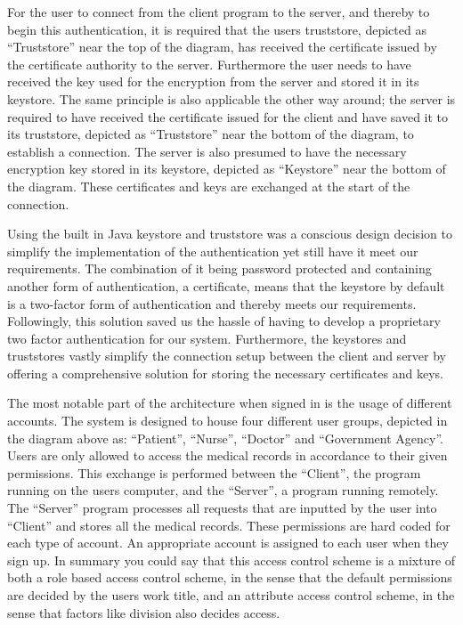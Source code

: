 \documentclass{article}
\begin{document}
For the user to connect from the client program to the server, and thereby to begin this authentication, it is required that the users truststore, depicted as “Truststore” near the top of the diagram, has received the certificate issued by the certificate authority to the server. Furthermore the user needs to have received the key used for the encryption from the server and stored it in its keystore. The same principle is also applicable the other way around; the server is required to have received the certificate issued for the client and have saved it to its truststore, depicted as “Truststore” near the bottom of the diagram, to establish a connection. The server is also presumed to have the necessary encryption key stored in its keystore, depicted as “Keystore” near the bottom of the diagram. These certificates and keys are exchanged at the start of the connection.

Using the built in Java keystore and truststore was a conscious design decision to simplify the implementation of the authentication yet still have it meet our requirements. The combination of it being password protected and containing another form of authentication, a certificate, means that the keystore by default is a two-factor form of authentication and thereby meets our requirements. Followingly, this solution saved us the hassle of having to develop a proprietary two factor authentication for our system. Furthermore, the keystores and truststores vastly simplify the connection setup between the client and server by offering a comprehensive solution for storing the necessary certificates and keys.

The most notable part of the architecture when signed in is the usage of different accounts. The system is designed to house four different user groups, depicted in the diagram above as: “Patient”, “Nurse”, “Doctor” and “Government Agency”. Users are only allowed to access the medical records in accordance to their given permissions. This exchange is performed between the “Client”, the program running on the users computer, and the “Server”, a program running remotely. The “Server” program processes all requests that are inputted by the user into “Client” and stores all the medical records. These permissions are hard coded for each type of account. An appropriate account is assigned to each user when they sign up. In summary you could say that this access control scheme is a mixture of both a role based access control scheme, in the sense that the default permissions are decided by the users work title, and an attribute access control scheme, in the sense that factors like division also decides access. 
\end{document}
